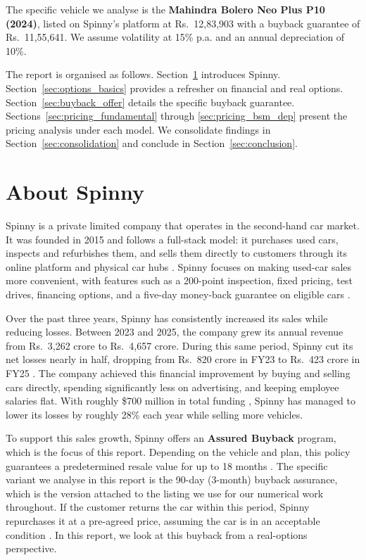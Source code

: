\documentclass[11pt, a4paper]{article}
\begin{document}
The specific vehicle we analyse is the \textbf{Mahindra Bolero Neo Plus P10 (2024)}, listed on Spinny's platform at Rs.~12,83,903 with a buyback guarantee of Rs.~11,55,641. We assume volatility at 15\% p.a. and an annual depreciation of 10\%.

The report is organised as follows. Section~\ref{sec:about} introduces Spinny. Section~\ref{sec:options_basics} provides a refresher on financial and real options. Section~\ref{sec:buyback_offer} details the specific buyback guarantee. Sections~\ref{sec:pricing_fundamental} through \ref{sec:pricing_bsm_dep} present the pricing analysis under each model. We consolidate findings in Section~\ref{sec:consolidation} and conclude in Section~\ref{sec:conclusion}.


\section{About Spinny}
\label{sec:about}

Spinny is a private limited company that operates in the second-hand car market. It was founded in 2015 and follows a full-stack model: it purchases used cars, inspects and refurbishes them, and sells them directly to customers through its online platform and physical car hubs \cite{forbesindia2023}. Spinny focuses on making used-car sales more convenient, with features such as a 200-point inspection, fixed pricing, test drives, financing options, and a five-day money-back guarantee on eligible cars \cite{spinnyassured}.

Over the past three years, Spinny has consistently increased its sales while reducing losses. Between 2023 and 2025, the company grew its annual revenue from Rs.~3,262 crore to Rs.~4,657 crore. During this same period, Spinny cut its net losses nearly in half, dropping from Rs.~820 crore in FY23 to Rs.~423 crore in FY25 \cite{entrackr2025}. The company achieved this financial improvement by buying and selling cars directly, spending significantly less on advertising, and keeping employee salaries flat. With roughly \$700 million in total funding \cite{tracxn2026}, Spinny has managed to lower its losses by roughly 28\% each year while selling more vehicles.

To support this sales growth, Spinny offers an \textbf{Assured Buyback} program, which is the focus of this report. Depending on the vehicle and plan, this policy guarantees a predetermined resale value for up to 18 months \cite{spinnybuyback}. The specific variant we analyse in this report is the 90-day (3-month) buyback assurance, which is the version attached to the listing we use for our numerical work throughout. If the customer returns the car within this period, Spinny repurchases it at a pre-agreed price, assuming the car is in an acceptable condition \cite{spinnybuybackblog}. In this report, we look at this buyback from a real-options perspective.
\end{document}
